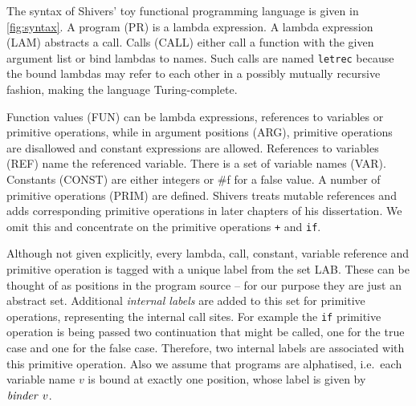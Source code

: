 \documentclass[a4paper,parskip=half,BCOR=8mm,DIV=calc,12pt]{scrbook}
\begin{document}
The syntax of Shivers’ toy functional programming language is given in \vref{fig:syntax}. A program (PR) is a lambda expression. A lambda expression (LAM) abstracts a call. Calls (CALL) either call a function with the given argument list or bind lambdas to names. Such calls are named \lstinline-letrec- because the bound lambdas may refer to each other in a possibly mutually recursive fashion, making the language Turing-complete.

Function values (FUN) can be lambda expressions, references to variables or primitive operations, while in argument positions (ARG), primitive operations are disallowed and constant expressions are allowed. References to variables (REF) name the referenced variable. There is a set of variable names (VAR). Constants (CONST) are either integers or \#f for a false value. A number of primitive operations (PRIM) are defined. Shivers treats mutable references and adds corresponding primitive operations in later chapters of his dissertation. We omit this and concentrate on the primitive operations \texttt+ and \texttt{if}.

Although not given explicitly, every lambda, call, constant, variable reference and primitive operation is tagged with a unique label from the set LAB. These can be thought of as positions in the program source – for our purpose they are just an abstract set.  Additional \textit{internal labels} are added to this set for primitive operations, representing the internal call sites. For example the \texttt{if} primitive operation is being passed two continuation that might be called, one for the true case and one for the false case. Therefore, two internal labels are associated with this primitive operation. Also we assume that programs are alphatised, i.e.\ each variable name $v$ is bound at exactly one position, whose label is given by $\text{\textit{binder}}\ v$.
\end{document}
